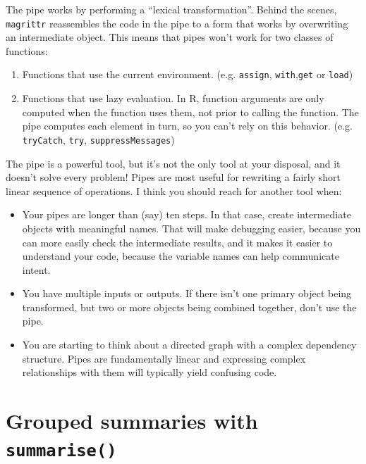 \documentclass[]{book}
\providecommand{\tightlist}{%
  \setlength{\itemsep}{0pt}\setlength{\parskip}{0pt}}
\theoremstyle{definition}
\theoremstyle{definition}
\theoremstyle{definition}
\theoremstyle{remark}
\begin{document}
The pipe works by performing a ``lexical transformation''. Behind the
scenes, \texttt{magrittr} reassembles the code in the pipe to a form
that works by overwriting an intermediate object. This means that pipes
won't work for two classes of functions:

\begin{enumerate}
\def\labelenumi{\arabic{enumi}.}
\tightlist
\item
  Functions that use the current environment. (e.g. \texttt{assign},
  \texttt{with},\texttt{get} or \texttt{load})
\item
  Functions that use lazy evaluation. In R, function arguments are only
  computed when the function uses them, not prior to calling the
  function. The pipe computes each element in turn, so you can't rely on
  this behavior. (e.g. \texttt{tryCatch}, \texttt{try},
  \texttt{suppressMessages})
\end{enumerate}

The pipe is a powerful tool, but it's not the only tool at your
disposal, and it doesn't solve every problem! Pipes are most useful for
rewriting a fairly short linear sequence of operations. I think you
should reach for another tool when:

\begin{itemize}
\tightlist
\item
  Your pipes are longer than (say) ten steps. In that case, create
  intermediate objects with meaningful names. That will make debugging
  easier, because you can more easily check the intermediate results,
  and it makes it easier to understand your code, because the variable
  names can help communicate intent.
\item
  You have multiple inputs or outputs. If there isn't one primary object
  being transformed, but two or more objects being combined together,
  don't use the pipe.
\item
  You are starting to think about a directed graph with a complex
  dependency structure. Pipes are fundamentally linear and expressing
  complex relationships with them will typically yield confusing code.
\end{itemize}

\hypertarget{grouped-summaries-with-summarise}{%
\section{\texorpdfstring{Grouped summaries with
\texttt{summarise()}}{Grouped summaries with summarise()}}\label{grouped-summaries-with-summarise}}
\end{document}
